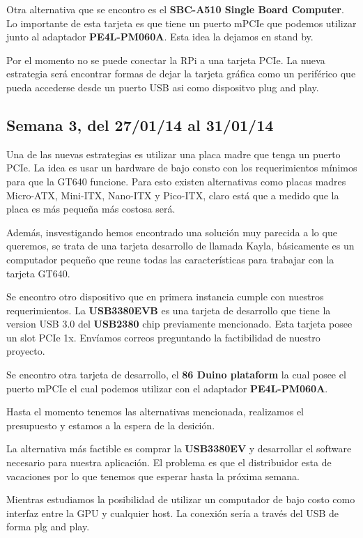 \documentclass[11pt,oneside,titlepage]{article}
\begin{document}
Otra alternativa que se encontro es el \textbf{SBC-A510 Single Board Computer}. Lo
importante de esta tarjeta es que tiene un puerto mPCIe que podemos utilizar junto
al adaptador \textbf{PE4L-PM060A}. Esta idea la dejamos en stand by.

Por el momento no se puede conectar la RPi a una tarjeta PCIe. La nueva estrategia
será encontrar formas de dejar la tarjeta gráfica como un periférico que pueda
accederse desde un puerto USB asi como dispositvo plug and play.

\subsection*{Semana 3, del 27/01/14 al 31/01/14}

Una de las nuevas estrategias es utilizar una placa madre que tenga un puerto
PCIe. La idea es usar un hardware de bajo consto con los requerimientos mínimos
para que la GT640 funcione. Para esto existen alternativas como placas madres
Micro-ATX, Mini-ITX, Nano-ITX y Pico-ITX, claro está que a medido que la placa
es más pequeña más costosa será. 

Además, insvestigando hemos encontrado una solución muy parecida a lo que
queremos, se trata de una tarjeta desarrollo de llamada Kayla, básicamente es
un computador pequeño que reune todas las características para trabajar con la
tarjeta GT640.  

Se encontro otro dispositivo que en primera instancia cumple con nuestros
requerimientos. La \textbf{USB3380EVB} es una tarjeta de desarrollo que tiene la
version USB 3.0 del \textbf{USB2380} chip previamente mencionado. Esta tarjeta
posee un slot PCIe 1x. Envíamos correos preguntando la factibilidad de nuestro
proyecto.

Se encontro otra tarjeta de desarrollo, el \textbf{86 Duino plataform} la cual
posee el puerto mPCIe el cual podemos utilizar con el adaptador
\textbf{PE4L-PM060A}.

Hasta el momento tenemos las alternativas mencionada, realizamos el presupuesto y
estamos a la espera de la desición.

La alternativa más factible es comprar la \textbf{USB3380EV} y desarrollar el
software necesario para nuestra aplicación. El problema es que el distribuidor
esta de vacaciones por lo que tenemos que esperar hasta la próxima semana.

Mientras estudiamos la posibilidad de utilizar un computador de bajo costo como
interfaz entre la GPU y cualquier host. La conexión sería a trav\'es del USB de
forma plg and play.
\end{document}

